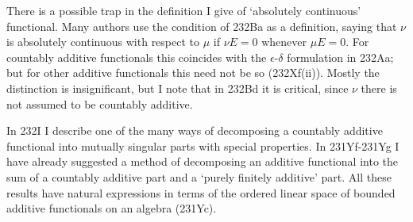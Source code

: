 {There is a possible trap in the definition I give of `absolutely
continuous' functional.   Many authors use the condition of 232Ba as a
definition, saying that $\nu$ is absolutely continuous with respect to
$\mu$ if $\nu E=0$ whenever $\mu E=0$.   For countably additive
functionals this coincides with the $\epsilon$-$\delta$ formulation in
232Aa;  but for other additive functionals this
need not be so (232Xf(ii)).   Mostly the distinction is insignificant,
but I
note that in 232Bd it is critical, since $\nu$ there is not assumed to
be countably additive.

In 232I I describe one of the many ways of decomposing a countably
additive functional into mutually singular parts with special
properties.   In 231Yf-231Yg I have already suggested a method of
decomposing an additive functional into the sum of a countably additive
part and a `purely finitely additive' part.   All these results have
natural expressions in terms of the ordered linear space of bounded
additive functionals on an algebra (231Yc).
}%

\discrpage


